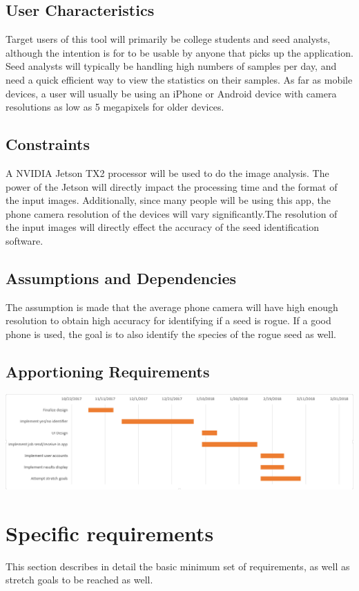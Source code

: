 \documentclass[onecolumn, draftclsnofoot,10pt, compsoc]{IEEEtran}
\begin{document}
\subsection{User Characteristics}
Target users of this tool will primarily be college students and seed analysts, although the intention is for to be usable by anyone that picks up the application. Seed analysts will typically be handling high numbers of samples per day, and need a quick efficient way to view the statistics on their samples. As far as mobile devices, a user will usually be using an iPhone or Android device with camera resolutions as low as 5 megapixels for older devices. 

\subsection{Constraints}
A NVIDIA Jetson TX2 processor will be used to do the image analysis.
The power of the Jetson will directly impact the processing time and the format of the input images. Additionally, since many people will be using this app, the phone camera resolution of the devices will vary significantly.The resolution of the input images will directly effect the accuracy of the seed identification software. 

\subsection{Assumptions and Dependencies}
The assumption is made that the average phone camera will have high enough resolution to obtain high accuracy for identifying if a seed is rogue. If a good phone is used, the goal is to also identify the species of the rogue seed as well. 

\subsection{Apportioning Requirements}
\includegraphics[scale=0.5]{gantt_chart.PNG}

\section{Specific requirements}
This section describes in detail the basic minimum set of requirements, as well as stretch goals to be reached as well. 
\end{document}
